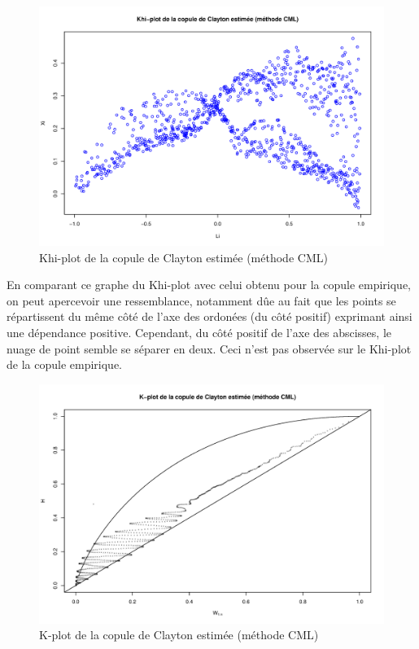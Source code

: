 \noindent%
\begin{figure}[H]
    \begin{center}
      \includegraphics[width=17 cm, angle=0]{./pictures/claytoncmlkhiplot.png}
      \centering\caption{\label{2}Khi-plot de la copule de Clayton estimée (méthode CML)}
    \end{center}
\end{figure}

En comparant ce graphe du Khi-plot avec celui obtenu pour la copule empirique, on peut apercevoir une ressemblance, notamment dûe au fait que les points se répartissent du même côté de l'axe des ordonées (du côté positif) exprimant ainsi une dépendance positive. Cependant, du côté positif de l'axe des abscisses, le nuage de point semble se séparer en deux. Ceci n'est pas observée sur le Khi-plot de la copule empirique. 

\noindent%
\begin{figure}[H]
    \begin{center}
      \includegraphics[width=17 cm, angle=0]{./pictures/claytoncmlkplot.png}
      \centering\caption{\label{2}K-plot de la copule de Clayton estimée (méthode CML)}
    \end{center}
\end{figure}

